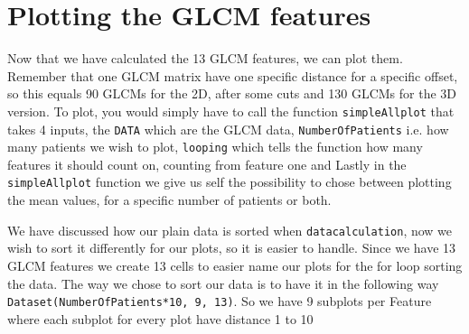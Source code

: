\section{Plotting the GLCM features}
Now that we have calculated the 13 GLCM features, we can plot them. Remember that one GLCM matrix have one specific distance for a specific offset, so this equals 90 GLCMs for the 2D, after some cuts and 130 GLCMs for the 3D version. To plot, you would simply have to call the function \texttt{simpleAllplot} that takes 4 inputs, the \texttt{DATA} which are the GLCM data, \texttt{NumberOfPatients} i.e. how many patients we wish to plot, \texttt{looping} which tells the function how many features it should count on, counting from feature one and Lastly in the \texttt{simpleAllplot} function we give us self the possibility to chose between plotting the mean values, for a specific number of patients or both.

We have discussed how our plain data is sorted when \texttt{datacalculation}, now we wish to sort it differently for our plots, so it is easier to handle. Since we have 13 GLCM features  we create 13 cells to easier name our plots for the for loop sorting the data. The way we chose to sort our data is to have it in the following way \texttt{Dataset(NumberOfPatients*10, 9, 13)}. So we have 9 subplots per Feature where each subplot for every plot have distance 1 to 10 




